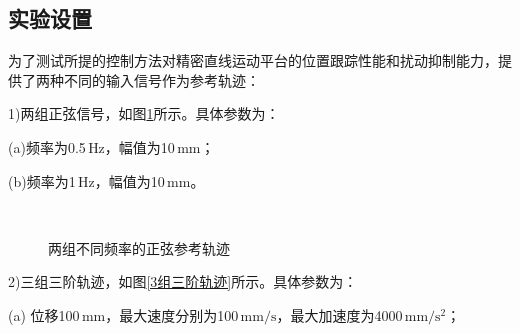 \subsection{实验设置}
为了测试所提的控制方法对精密直线运动平台的位置跟踪性能和扰动抑制能力，提供了两种不同的输入信号作为参考轨迹：

1)两组正弦信号，如图\ref{正弦参考轨迹}所示。具体参数为：

(a)频率为0.5$\,\text{Hz}$，幅值为10$\,\text{mm}$；

(b)频率为1$\,\text{Hz}$，幅值为10$\,\text{mm}$。
\begin{figure}[H]
	\centering
	\\
	\caption{两组不同频率的正弦参考轨迹}
	\label{正弦参考轨迹}
\end{figure}
2)三组三阶轨迹，如图\ref{3组三阶轨迹}所示。具体参数为：

(a) 位移100$\,\text{mm}$，最大速度分别为100$\,\text{mm$/$s}$，最大加速度为4000$\,\text{mm/s$^2$}$；

